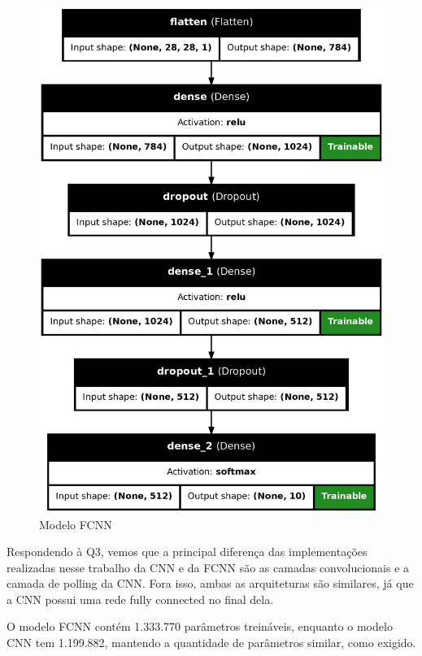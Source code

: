 \documentclass[12pt]{article}
\begin{document}
\begin{figure}[H]
  \hfill
  \begin{minipage}{0.4\textwidth}
    \centering
    \includegraphics[width=\textwidth]{../images/models/model_fcnn_graph.png}
    \caption{Modelo FCNN}
    \label{fig:model_fcnn_graph}
  \end{minipage}
\end{figure}

Respondendo à Q3, vemos que a principal diferença das implementações realizadas nesse trabalho da CNN e da FCNN são as camadas convolucionais e a camada de polling da CNN. Fora isso, ambas as arquiteturas são similares, já que a CNN possui uma rede fully connected no final dela.

O modelo FCNN contém 1.333.770 parâmetros treináveis, enquanto o modelo CNN tem 1.199.882, mantendo a quantidade de parâmetros similar, como exigido.
\end{document}
